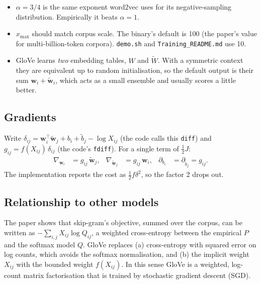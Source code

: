 \documentclass[11pt,a4paper]{article}
\newcommand{\file}[1]{\texttt{#1}}
\newcommand{\wv}{\mathbf{w}}
\newcommand{\cv}{\tilde{\mathbf{w}}}
\begin{document}
\begin{insight}
\begin{itemize}[leftmargin=1em,nosep]
  \item $\alpha=3/4$ is the same exponent word2vec uses for its negative-sampling
        distribution. Empirically it beats $\alpha=1$.
  \item $x_{\max}$ should match corpus scale. The binary's default is 100 (the paper's
        value for multi-billion-token corpora). \file{demo.sh} and \file{Training\_README.md}
        use 10.
  \item GloVe learns \emph{two} embedding tables, $W$ and $\tilde W$. With a symmetric
        context they are equivalent up to random initialisation, so the default output is
        their sum $\wv_i+\cv_i$, which acts as a small ensemble and usually scores a little
        better.
\end{itemize}
\end{insight}

\subsection{Gradients}

Write $\delta_{ij} = \wv_i^\top\cv_j + b_i + \tilde b_j - \log X_{ij}$ (the code calls this
\texttt{diff}) and $g_{ij}=f(X_{ij})\,\delta_{ij}$ (the code's \texttt{fdiff}). For a single
term of $\tfrac12 J$:
\begin{align}
  \nabla_{\wv_i} &= g_{ij}\,\cv_j, &
  \nabla_{\cv_j} &= g_{ij}\,\wv_i, &
  \partial_{b_i} &= \partial_{\tilde b_j} = g_{ij}.
\end{align}
The implementation reports the cost as $\tfrac12 f\delta^2$, so the factor 2 drops out.

\subsection{Relationship to other models}

The paper shows that skip-gram's objective, summed over the corpus, can be written as
$-\sum_{i,j} X_{ij}\log Q_{ij}$, a weighted cross-entropy between the empirical $P$ and the
softmax model $Q$. GloVe replaces (a) cross-entropy with squared error on log counts,
which avoids the softmax normalisation, and (b) the implicit weight $X_{ij}$ with the
bounded weight $f(X_{ij})$. In this sense GloVe is a weighted, log-count matrix
factorisation that is trained by stochastic gradient descent (SGD).

\end{document}

